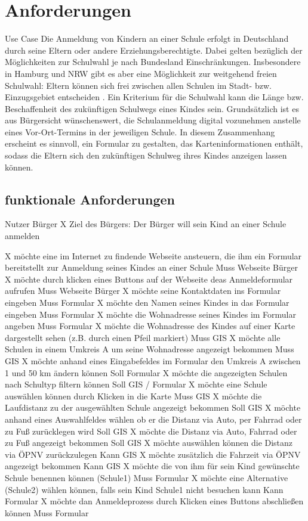 \chapter{Anforderungen}
\label{cha:anforderungen}

Use Case
Die Anmeldung von Kindern an einer Schule erfolgt in Deutschland durch seine Eltern oder andere Erziehungsberechtigte. Dabei gelten bezüglich der Möglichkeiten zur Schulwahl je nach Bundesland Einschränkungen. Insbesondere in Hamburg und NRW gibt es aber eine Möglichkeit zur weitgehend freien Schulwahl: Eltern können sich frei zwischen allen Schulen im Stadt- bzw. Einzugsgebiet entscheiden \citep{schulwahl_nrw}. Ein Kriterium für die Schulwahl kann die Länge bzw. Beschaffenheit des zukünftigen Schulwegs eines Kindes sein. Grundsätzlich ist es aus Bürgersicht wünschenswert, die Schulanmeldung digital vozunehmen anstelle eines Vor-Ort-Termins in der jeweiligen Schule. In diesem Zusammenhang erscheint es sinnvoll, ein Formular zu gestalten, das Karteninformationen enthält, sodass die Eltern sich den zukünftigen Schulweg ihres Kindes anzeigen lassen können.

\section{funktionale Anforderungen}
Nutzer Bürger X
Ziel des Bürgers: Der Bürger will sein Kind an einer Schule anmelden

X möchte eine im Internet zu findende Webseite ansteuern, die ihm ein Formular bereitstellt zur Anmeldung seines Kindes an einer Schule	Muss	Webseite Bürger
X möchte durch klicken eines Buttons auf der Webseite deas Anmeldeformular aufrufen	Muss	Webseite Bürger
X möchte seine Kontaktdaten ins Formular eingeben	Muss	Formular
X möchte den Namen seines Kindes in das Formular eingeben	Muss	Formular
X möchte die Wohnadresse seines Kindes im Formular angeben	Muss	Formular
X möchte die Wohnadresse des Kindes auf einer Karte dargestellt sehen (z.B. durch einen Pfeil markiert)	Muss	GIS 
X möchte alle Schulen in einem Umkreis A um seine Wohnadresse angezeigt bekommen	Muss	GIS
X möchte anhand eines Eingabefeldes im Formular den Umkreis A zwischen 1 und 50 km ändern können	Soll	Formular
X möchte die angezeigten Schulen nach Schultyp filtern können	Soll	GIS / Formular
X möchte eine Schule auswählen können durch Klicken in die Karte	Muss	GIS
X möchte die Laufdistanz zu der ausgewählten Schule angezeigt bekommen	Soll	GIS
X möchte anhand eines Auswahlfeldes wählen ob er die Distanz via Auto, per Fahrrad oder zu Fuß zurücklegen wird	Soll	GIS
X möchte die Distanz via Auto, Fahrrad oder zu Fuß angezeigt bekommen	Soll	GIS
X möchte auswählen können die Distanz via ÖPNV zurückzulegen	Kann	GIS
X möchte zusätzlich die Fahrzeit via ÖPNV angezeigt bekommen	Kann	GIS
X möchte die von ihm für sein Kind gewünschte Schule benennen können (Schule1)	Muss	Formular
X möchte eine Alternative (Schule2) wählen können, falls sein Kind Schule1 nicht besuchen kann	Kann	Formular
X möchte dan Anmeldeprozess durch Klicken eines Buttons abschließen können	Muss	Formular


